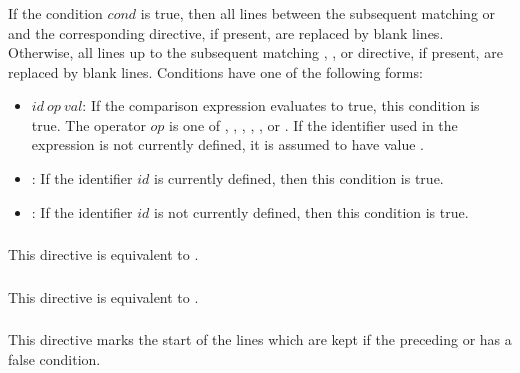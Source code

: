 \subsubsection*{}

If the condition $\mathit{cond}$ is true,
then all lines between the subsequent matching
 or  and the corresponding
 directive, if present,
are replaced by blank lines.
Otherwise, all lines up to the subsequent matching
, , or  directive, if present,
are replaced by blank lines.
%
Conditions have one of the following forms:
\begin{itemize}
\item
$\mathit{id}~\mathit{op}~\mathit{val}$:
If the comparison expression evaluates to true, this condition is true.
The operator $\mathit{op}$ is one of
\code{==}, \code{/=}, \code{<}, \code{<=}, \code{>}, or \code{>=}.
If the identifier used in the expression is not currently defined,
it is assumed to have value .
\item
{}:
If the identifier $\mathit{id}$ is currently defined,
then this condition is true.
\item
{}:
If the identifier $\mathit{id}$ is not currently defined,
then this condition is true.
\end{itemize}


\subsubsection*{}

This directive is equivalent to .

\subsubsection*{}

This directive is equivalent to .

\subsubsection*{}

This directive marks the start of the lines which are kept
if the preceding  or  has a false condition.

